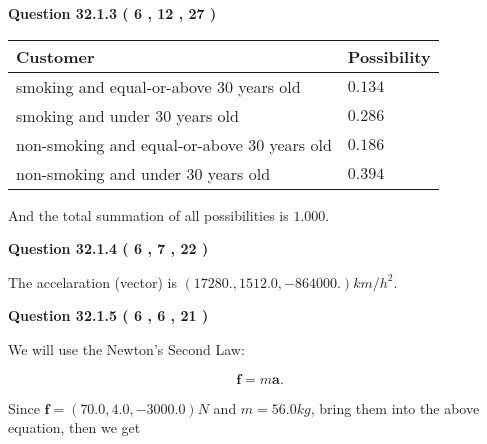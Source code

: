 \documentclass[12pt]{article}
\begin{document}
 
 
 
  
\vspace{0.2in}
  
{\textbf{\Large{Question
32.1.3 
 (           6 ,          12 ,          27 )
}}}
  
  
 
 
\noindent{}

 
\noindent
\begin{tabular}{|l|l|}
\hline
Customer & Possibility \\
\hline
smoking  and  %
equal-or-above 30 years old &
  $ %
0.134$ \\
\hline
smoking  and  %
under 30 years old &
  $ %
0.286$ \\
\hline
 non-smoking and  %
equal-or-above 30 years old &
  $ %
0.186$ \\
\hline
 non-smoking and  %
under 30 years old &
  $ %
0.394$ \\
\hline
\end{tabular}
 
\noindent
 And the total summation of all possibilities is $  %
1.000 $.
 
 
 
  
\vspace{0.2in}
  
{\textbf{\Large{Question
32.1.4 
 (           6 ,           7 ,          22 )
}}}
  
  
 
 
\noindent{}
 
 
The accelaration (vector) is
$(
17280.,
1512.0 ,
-864000.
)km/h^2.
$
 
 
 
 
  
\vspace{0.2in}
  
{\textbf{\Large{Question
32.1.5 
 (           6 ,           6 ,          21 )
}}}
  
  
 
 
\noindent{}

We will use the Newton's Second Law:
 
\[
\mathbf{f}=m\mathbf{a}.
\]
 
Since $\mathbf{f}=( %
70.0,  %
4.0,  %
-3000.0 )N$
and $m= %
56.0 kg$, bring them into the above equation, then we get
 
\end{document}
